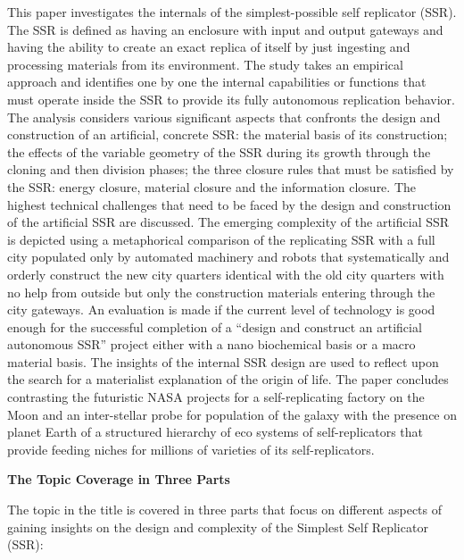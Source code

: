 \documentclass[letterpaper]{article}
\begin{document}
This paper investigates the internals of the simplest-possible self
replicator (SSR). The SSR is defined as having an enclosure with input
and output gateways and having the ability to create an exact replica
of itself by just ingesting and processing materials from its
environment. The study takes an empirical approach and identifies one
by one the internal capabilities or functions that must operate inside
the SSR to provide its fully autonomous replication behavior. The
analysis considers various significant aspects that confronts the
design and construction of an artificial, concrete SSR: the material
basis of its construction; the effects of the variable geometry of the
SSR during its growth through the cloning and then division phases; the
three closure rules that must be satisfied by the SSR: energy closure,
material closure and the information closure. The highest technical
challenges that need to be faced by the design and construction of the
artificial SSR are discussed. The emerging complexity of the artificial
SSR is depicted using a metaphorical comparison of the replicating SSR
with a full city populated only by automated machinery and robots that
systematically and orderly construct the new city quarters identical
with the old city quarters with no help from outside but only the
construction materials entering through the city gateways. An
evaluation is made if the current level of technology is good enough
for the successful completion of a “design and construct an artificial
autonomous SSR” project either with a nano biochemical basis or a macro
material basis. The insights of the internal SSR design are used to
reflect upon the search for a materialist explanation of the origin of
life. The paper concludes contrasting the futuristic NASA projects for
a self-replicating factory on the Moon and an inter-stellar probe for
population of the galaxy with the presence on planet Earth of a
structured hierarchy of eco systems of self-replicators that provide
feeding niches for millions of varieties of its self-replicators. 


\bigskip

{\bfseries\color[rgb]{0.21176471,0.37254903,0.5686275}
The Topic Coverage in Three Parts}


\bigskip

The topic in the title is covered in three parts that focus on different
aspects of gaining insights on the design and complexity of the
Simplest Self Replicator (SSR):


\bigskip
\end{document}
